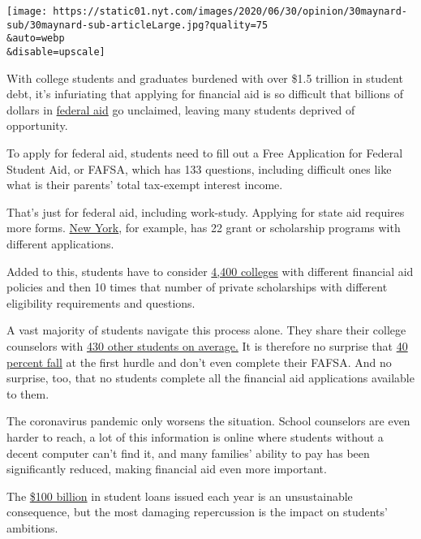 \texttt{[image: https://static01.nyt.com/images/2020/06/30/opinion/30maynard-sub/30maynard-sub-articleLarge.jpg?quality=75\\\&auto=webp\\\&disable=upscale]}

With college students and graduates burdened with over \$1.5 trillion in
student debt, it's infuriating that applying for financial aid is so
difficult that billions of dollars in
\href{https://www.nerdwallet.com/blog/2018-fafsa-study/}{federal aid} go
unclaimed, leaving many students deprived of opportunity.

To apply for federal aid, students need to fill out a Free Application
for Federal Student Aid, or FAFSA, which has 133 questions, including
difficult ones like what is their parents' total tax-exempt interest
income.

That's just for federal aid, including work-study. Applying for state
aid requires more forms.
\href{https://www.hesc.ny.gov/pay-for-college/financial-aid/types-of-financial-aid.html\#horizontalTab2}{New
York}, for example, has 22 grant or scholarship programs with different
applications.

Added to this, students have to consider
\href{https://nces.ed.gov/fastfacts/display.asp?id=84}{4,400 colleges}
with different financial aid policies and then 10 times that number of
private scholarships with different eligibility requirements and
questions.

A vast majority of students navigate this process alone. They share
their college counselors with
\href{https://www.schoolcounselor.org/asca/media/asca/home/Ratios18-19.pdf}{430
other students on average.} It is therefore no surprise that
\href{https://studentaid.gov/data-center/student/application-volume/fafsa-completion-high-school}{40
percent fall} at the first hurdle and don't even complete their FAFSA.
And no surprise, too, that no students complete all the financial aid
applications available to them.

The coronavirus pandemic only worsens the situation. School counselors
are even harder to reach, a lot of this information is online where
students without a decent computer can't find it, and many families'
ability to pay has been significantly reduced, making financial aid even
more important.

The
\href{https://research.collegeboard.org/trends/student-aid/figures-tables/total-federal-and-nonfederal-loans-type-over-time}{\$100
billion} in student loans issued each year is an unsustainable
consequence, but the most damaging repercussion is the impact on
students' ambitions.

